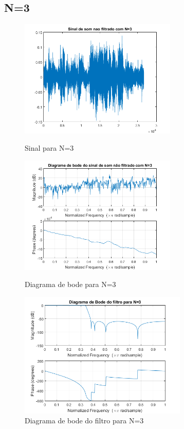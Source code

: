 \documentclass[11pt]{article}
\begin{document}
\subsection{N=3}
\begin{figure}[h]
\begin{center}
\begin{minipage}[b]{0.45\linewidth}
\includegraphics[width=7.5cm]{nfds3.png}
\caption{Sinal para N=3}
\label{figura8}
\end{minipage}
\begin{minipage}[b]{0.45\linewidth}
\includegraphics[width=7.5cm]{nfdb3.png}
\caption{Diagrama de bode para N=3}
\label{figura9}
\end{minipage}
\newline
\newline
\includegraphics[width=8cm]{filtro3.png}
\caption{Diagrama de bode do filtro para N=3}
\label{figura10}
\end{center}
\end{figure}
\end{document}
